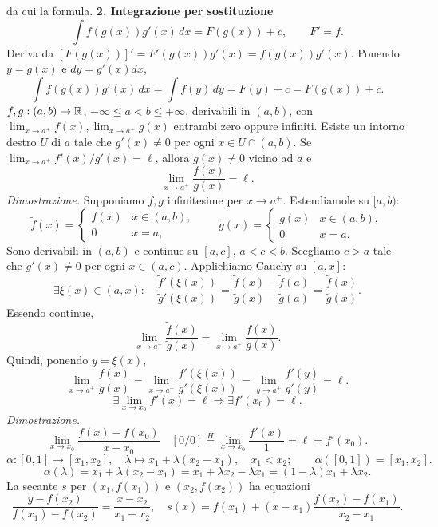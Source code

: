 da cui la formula.
\textbf{2. Integrazione per sostituzione}
\[\int f(g(x))g'(x)\,dx=F(g(x))+c,\qquad F'=f.\]
Deriva da $[F(g(x))]'=F'(g(x))g'(x)=f(g(x))g'(x)$.
Ponendo $y=g(x)$ e $dy=g'(x)dx$,
\[\int f(g(x))g'(x)\,dx=\int f(y)\,dy=F(y)+c=F(g(x))+c.\]
$f,g:(a,b)\to\mathbb R$, $-\infty\le a<b\le+\infty$, derivabili in $(a,b)$, con $\lim_{x\to a^+}f(x),\lim_{x\to a^+}g(x)$ entrambi zero oppure infiniti.
Esiste un intorno destro $U$ di $a$ tale che $g'(x)\ne0$ per ogni $x\in U\cap(a,b)$.
Se $\lim_{x\to a^+}f'(x)/g'(x)=\ell$, allora $g(x)\ne0$ vicino ad $a$ e
\[\lim_{x\to a^+}\frac{f(x)}{g(x)}=\ell.\]
\textit{Dimostrazione.} Supponiamo $f,g$ infinitesime per $x\to a^+$. Estendiamole su $[a,b)$:
\[\widetilde f(x)=\begin{cases}f(x)&x\in(a,b),\\0&x=a,\end{cases}\qquad
\widetilde g(x)=\begin{cases}g(x)&x\in(a,b),\\0&x=a.\end{cases}\]
Sono derivabili in $(a,b)$ e continue su $[a,c]$, $a<c<b$.
Scegliamo $c>a$ tale che $g'(x)\ne0$ per ogni $x\in(a,c)$. Applichiamo Cauchy su $[a,x]$:
\[\exists\xi(x)\in(a,x):\quad\frac{\widetilde f'(\xi(x))}{\widetilde g'(\xi(x))}
=\frac{\widetilde f(x)-\widetilde f(a)}{\widetilde g(x)-\widetilde g(a)}=\frac{\widetilde f(x)}{\widetilde g(x)}.\]
Essendo continue,
\[\lim_{x\to a^+}\frac{\widetilde f(x)}{\widetilde g(x)}=\lim_{x\to a^+}\frac{f(x)}{g(x)}.\]
Quindi, ponendo $y=\xi(x)$,
\[\lim_{x\to a^+}\frac{f(x)}{g(x)}=\lim_{x\to a^+}\frac{f'(\xi(x))}{g'(\xi(x))}=\lim_{y\to a^+}\frac{f'(y)}{g'(y)}=\ell.\]
\[\exists\lim_{x\to x_0}f'(x)=\ell\Longrightarrow\exists f'(x_0)=\ell.\]
\textit{Dimostrazione.}
\[\lim_{x\to x_0}\frac{f(x)-f(x_0)}{x-x_0}\quad[0/0]\overset H=\lim_{x\to x_0}\frac{f'(x)}1=\ell=f'(x_0).\]
\[\alpha:[0,1]\to[x_1,x_2],\quad\lambda\mapsto x_1+\lambda(x_2-x_1),\quad x_1<x_2;\qquad\alpha([0,1])=[x_1,x_2].\]
\[\alpha(\lambda)=x_1+\lambda(x_2-x_1)=x_1+\lambda x_2-\lambda x_1=(1-\lambda)x_1+\lambda x_2.\]
La secante $s$ per $(x_1,f(x_1))$ e $(x_2,f(x_2))$ ha equazioni
\[\frac{y-f(x_2)}{f(x_1)-f(x_2)}=\frac{x-x_2}{x_1-x_2},\quad
s(x)=f(x_1)+(x-x_1)\frac{f(x_2)-f(x_1)}{x_2-x_1}.\]
